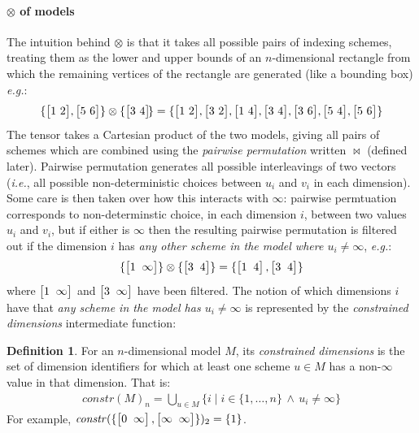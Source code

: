 \documentclass[9pt]{sigplanconf}
\newcounter{block}
\theoremstyle{definition}
\newtheorem{definition}[block]{Definition}
\newcommand{\ie}{\emph{i.e.}}
\newcommand{\eg}{\emph{e.g.}}
\newcommand{\vtwohs}[2]{\setlength{\arraycolsep}{0em}
\left[\begin{array}{cc}#1 \, & \, #2\end{array}\right]\!}
\newcommand{\vtwoh}[2]{\setlength{\arraycolsep}{0em}
\left[\begin{array}{cc}#1 \; & \; #2\end{array}\right]}
\newcommand{\effdims}[2]{\mathit{constr}(#1)_{#2}}
\begin{document}
\paragraph{$\otimes$ of models}

The intuition behind $\otimes$ is that it takes
all possible pairs of indexing schemes, treating them as the
lower and upper bounds of an $n$-dimensional rectangle from which the
remaining vertices of the rectangle are generated (like a bounding
box) \eg{}:
\begin{align*}
\{\vtwohs{1}{2}, \vtwohs{5}{6}\,\} \otimes \{\vtwohs{3}{4}\} =
\{\vtwohs{1}{2}, \vtwohs{3}{2}, \vtwohs{1}{4}, \vtwohs{3}{4}, 
   \vtwohs{3}{6}, \vtwohs{5}{4}, \vtwohs{5}{6}\,\}
\end{align*}
The tensor takes a Cartesian product of the two models,
giving all pairs of schemes which are combined using the
\emph{pairwise permutation} written $\bowtie$ (defined later).
Pairwise permutation generates all possible interleavings of two vectors
(\ie{}, all possible non-deterministic choices between $u_i$ and
$v_i$ in each dimension). Some care is then taken over
how this interacts with $\infty$: pairwise permtuation
corresponds to non-determinstic choice, in each dimension $i$,
between two values $u_i$ and $v_i$, but if either
is $\infty$ then the resulting pairwise permutation is
filtered out if the dimension $i$ has \emph{any other scheme
in the model where $u_i \neq \infty$}, \eg{}:
\begin{align*}
\{\vtwoh{1}{\infty}\} \otimes \{\vtwoh{3}{4}\} =
\{\vtwoh{1}{4}, \vtwoh{3}{4}\}
\end{align*}
%
where $\vtwoh{1}{\infty}$ and $\vtwoh{3}{\infty}$ have been filtered.
%
%
%
The notion of which dimensions $i$ have that \emph{any scheme in the model
has $u_i \neq \infty$} is represented by the \emph{constrained
dimensions} intermediate function:
%
\begin{definition}%
For an $n$-dimensional model $M$, its \emph{constrained dimensions}
is the set of dimension identifiers for which at least one scheme $u \in M$ has
a non-$\infty$ value in that dimension. That is:
%
\begin{align*}
\effdims{M}{n} =
\bigcup_{u \in M} \{i \mid i \in \{1,\ldots,n\} \, \wedge \, u_i \neq
  \infty\}
\end{align*}
For example, $\effdims{\{\vtwoh{0}{\infty},\vtwoh{\infty}{\infty}\}}{2}
 = \{1\}$.
\end{definition}
\end{document}
